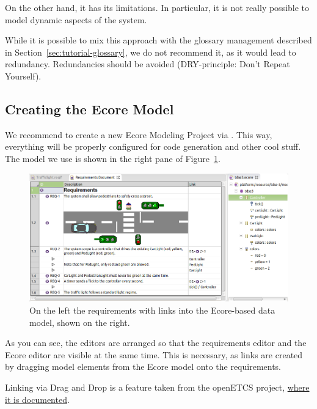 On the other hand, it has its limitations.  In particular, it is not really possible to model dynamic aspects of the system.

\begin{warning}
While it is possible to mix this approach with the glossary management described in Section~\ref{sec:tutorial-glossary}, we do not recommend it, as it would lead to redundancy.  Redundancies should be avoided (DRY-principle: Don't Repeat Yourself).
\end{warning}

\subsection{Creating the Ecore Model}

We recommend to create a new Ecore Modeling Project via .   This way, everything will be properly configured for code generation and other cool stuff.  The model we use is shown in the right pane of Figure~\ref{fig:tutorial-step03}.

\begin{figure}[h!]
  \centering
  \includegraphics[width=\linewidth]{../se-images/tutorial-step03.png}
  \caption{On the left the requirements with links into the Ecore-based data model, shown on the right.}
  \label{fig:tutorial-step03}
\end{figure}

As you can see, the editors are arranged so that the requirements editor and the Ecore editor are visible at the same time.  This is necessary, as links are created by dragging model elements from the Ecore model onto the requirements.

\begin{info}
Linking via Drag and Drop is a feature taken from the openETCS project, \href{https://github.com/openETCS/toolchain/wiki/User-Documentation#Tracing_Requirements_and_SysML_Models}{where it is documented}.
\end{info}

